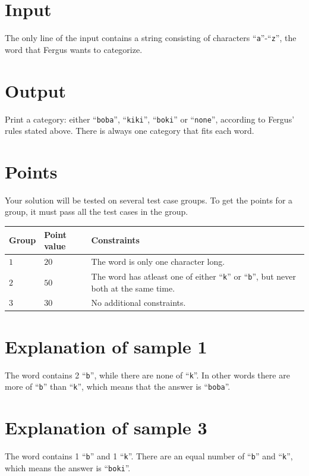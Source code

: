 \section*{Input}
The only line of the input contains a string consisting of characters ``\texttt{a}''-``\texttt{z}'', the word that Fergus wants to categorize.

\section*{Output}
Print a category: either ``\texttt{boba}'', ``\texttt{kiki}'', ``\texttt{boki}'' or ``\texttt{none}'', according to Fergus' rules stated above.
There is always one category that fits each word.

\section*{Points}
Your solution will be tested on several test case groups.
To get the points for a group, it must pass all the test cases in the group.

\noindent
\begin{tabular}{| l | l | p{12cm} |}
  \hline
  \textbf{Group} & \textbf{Point value} & \textbf{Constraints} \\ \hline
  $1$    & $20$       & The word is only one character long. \\ \hline
  $2$    & $50$       & The word has atleast one of either ``\texttt{k}'' or ``\texttt{b}'', but never both at the same time. \\ \hline
  $3$    & $30$       & No additional constraints. \\ \hline
\end{tabular}

\section*{Explanation of sample 1}
The word contains 2 ``\texttt{b}'', while there are none of ``\texttt{k}''. In other words there are more of ``\texttt{b}'' than ``\texttt{k}'', which means that the answer is ``\texttt{boba}''.

\section*{Explanation of sample 3}
The word contains 1 ``\texttt{b}'' and 1 ``\texttt{k}''. There are an equal number of ``\texttt{b}'' and ``\texttt{k}'', which means the answer is ``\texttt{boki}''.

